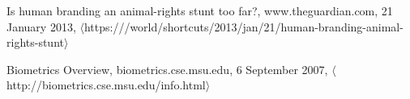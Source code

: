 \begin{thebibliography}{1}

  Is human branding an animal-rights stunt too far?,
  www.theguardian.com,
  21 January 2013,
  $\langle$https:///world/shortcuts/2013/jan/21/human-branding-animal-rights-stunt$\rangle$

  Biometrics Overview,
  biometrics.cse.msu.edu,
  6 September 2007,
  $\langle$http://biometrics.cse.msu.edu/info.html$\rangle$

\end{thebibliography}
